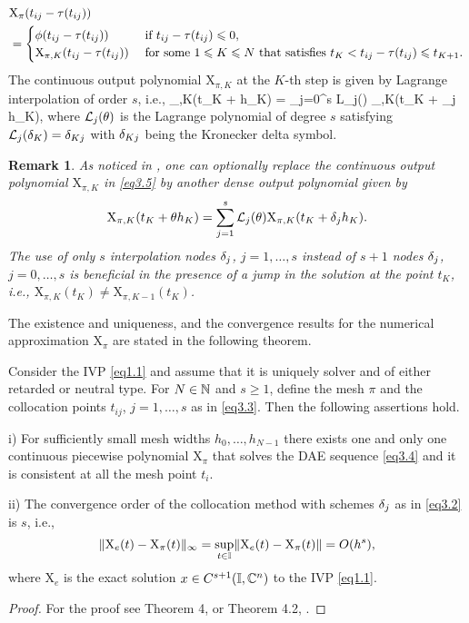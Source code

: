 \documentclass[final,reqno]{siamltex}
\newtheorem{remark}[theorem]{Remark}
\begin{document}
%
\[
\begin{split} 
 & \mathrm{X}_{\pi}(t_{ij}-\tau(t_{ij})) \\
 & =  
 \begin{cases}
  \phi(t_{ij}-\tau(t_{ij}))                & \mbox{ if } t_{ij}-\tau(t_{ij}) \leqslant 0, \\
  \mathrm{X}_{\pi,K}(t_{ij}-\tau(t_{ij}))  & \mbox{ for some $ 1 \leqslant K \leqslant N$ that satisfies } t_K < t_{ij}-\tau(t_{ij}) \leqslant t_{K+1}.
 \end{cases}
 \end{split} 
\]
%
The continuous output polynomial $\mathrm{X}_{\pi,K}$ at the $K$-th step is given by Lagrange interpolation of order $s$, i.e.,
%
\be\label{eq3.5}
 _{\pi,K}(t_K + \tet h_K) = \sum_{j=0}^s {\cal L}_j(\tet) _{\pi,K}(t_K + \de_j h_K),
\ee
%
where ${\cal L}_j(\tet)$ is the Lagrange polynomial of degree $s$ satisfying ${\cal L}_j(\de_K) = \de_{Kj}$ with $\delta_{Kj}$ being the Kronecker delta symbol.

\begin{remark}
 As noticed in \cite{GugH01,GugH07}, one can optionally replace the continuous output polynomial $\mathrm{X}_{\pi,K}$ in \eqref{eq3.5} by another dense output polynomial given by
 \[
  \mathrm{X}_{\pi,K}(t_K + \tet h_K) = \sum_{j=1}^s {\cal L}_j(\tet) \mathrm{X}_{\pi,K}(t_K + \de_j h_K).
 \]
 The use of only $s$ interpolation nodes $\delta_j$, $j=1,\dots,s$ instead of $s+1$ nodes $\delta_j$, $j=0,\dots,s$ is beneficial in the presence of a jump in the solution at the
 point $t_K$, i.e., $\mathrm{X}_{\pi,K}(t_K) \not= \mathrm{X}_{\pi,K-1}(t_K)$.
\end{remark}

The existence and uniqueness, and the convergence results for the numerical approximation $\mathrm{X}_{\pi}$ are stated in the following theorem.

\begin{theorem}\label{Thm6.1}
Consider the IVP \eqref{eq1.1} and assume that it is uniquely solver and of either retarded or neutral type. 
For $N \in \mathbb{N}$ and $s \geq 1$, define the mesh $\pi$ and the collocation points $t_{ij}$, $j=1,\dots,s$ as in \eqref{eq3.3}. 
Then the following assertions hold.
\begin{compactenum}
 \item[i)] For sufficiently small mesh widths $h_0,\dots,h_{N-1}$ there exists one and only one continuous piecewise polynomial $\mathrm{X}_{\pi}$ that solves 
 the DAE sequence \eqref{eq3.4} and it is consistent at all the mesh point $t_i$.
 \item[ii)] The convergence order of the collocation method with schemes $\delta_j$ as in \eqref{eq3.2} is $s$, i.e., 
 \[
  \| \mathrm{X}_e(t) - \mathrm{X}_{\pi}(t) \|_{\infty} = \underset{t \in \mathbb{I}}{\sup} \| \mathrm{X}_e(t) - \mathrm{X}_{\pi}(t) \| = O(h^s),
 \]
%
 where $\mathrm{X}_e$ is the exact solution  $x \in C^{s+1}(\mathbb{I},\mathbb{C}^n)$ to the IVP \eqref{eq1.1}.
\end{compactenum}
\end{theorem}
\begin{proof}
For the proof see Theorem 4, \cite{Hau97} or Theorem 4.2, \cite{GugH07}.
\end{proof}
%
\end{document}
